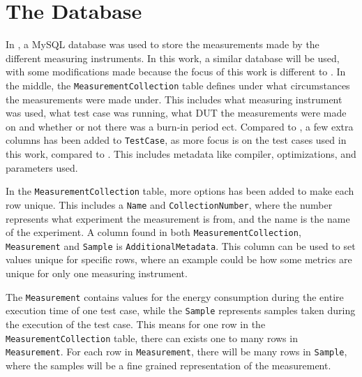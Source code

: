 \section{The Database}

In \cite{biksbois}, a MySQL database was used to store the measurements made by the different measuring instruments. In this work, a similar database will be used, with some modifications made because the focus of this work is different to \cite{biksbois}. In the middle, the \texttt{MeasurementCollection} table defines under what circumstances the measurements were made under. This includes what measuring instrument was used, what test case was running, what DUT the measurements were made on and whether or not there was a burn-in period ect. Compared to \cite{biksbois}, a few extra columns has been added to \texttt{TestCase}, as more focus is on the test cases used in this work, compared to \cite{biksbois}. This includes metadata like compiler, optimizations, and parameters used.


In the \texttt{MeasurementCollection} table, more options has been added to make each row unique. This includes a \texttt{Name} and \texttt{CollectionNumber}, where the number represents what experiment the measurement is from, and the name is the name of the experiment. A column found in both \texttt{MeasurementCollection}, \texttt{Measurement} and \texttt{Sample} is \texttt{AdditionalMetadata}. This column can be used to set values unique for specific rows, where an example could be how some metrics are unique for only one measuring instrument.


The \texttt{Measurement} contains values for the energy consumption during the entire execution time of one test case, while the \texttt{Sample} represents samples taken during the execution of the test case. This means for one row in the \texttt{MeasurementCollection} table, there can exists one to many rows in \texttt{Measurement}. For each row in \texttt{Measurement}, there will be many rows in \texttt{Sample}, where the samples will be a fine grained representation of the measurement.






%